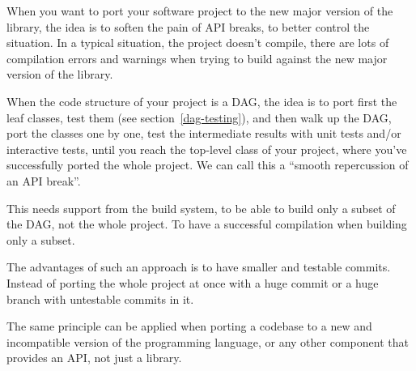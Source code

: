 \documentclass[a4paper,11pt]{article}
\begin{document}
When you want to port your software project to the new major version of the library, the idea is to soften the pain of API breaks, to better control the situation. In a typical situation, the project doesn't compile, there are lots of compilation errors and warnings when trying to build against the new major version of the library.

When the code structure of your project is a DAG, the idea is to port first the leaf classes, test them (see section~\ref{dag-testing}), and then walk up the DAG, port the classes one by one, test the intermediate results with unit tests and/or interactive tests, until you reach the top-level class of your project, where you've successfully ported the whole project. We can call this a ``smooth repercussion of an API break''.

This needs support from the build system, to be able to build only a subset of the DAG, not the whole project. To have a successful compilation when building only a subset.

The advantages of such an approach is to have smaller and testable commits. Instead of porting the whole project at once with a huge commit or a huge branch with untestable commits in it.

The same principle can be applied when porting a codebase to a new and incompatible version of the programming language, or any other component that provides an API, not just a library.


%
%
%
\end{document}
